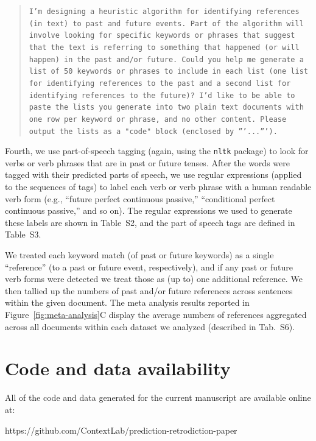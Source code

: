 \documentclass[10pt]{article}
\newcommand{\regExpTable}{S2}
\newcommand{\posTags}{S3}
\newcommand{\metaAnalysisDatasets}{S6}
\begin{document}
\begin{quote}
\texttt{I'm designing a heuristic algorithm for identifying references (in text) to
past and future events. Part of the algorithm will involve looking for specific
keywords or phrases that suggest that the text is referring to something that
happened (or will happen) in the past and/or future. Could you help me generate
a list of 50 keywords or phrases to include in each list (one list for
identifying references to the past and a second list for identifying references
to the future)? I'd like to be able to paste the lists you generate into two
plain text documents with one row per keyword or phrase, and no other content.
Please output the lists as a "code" block (enclosed by '''...''').}
\end{quote}
Fourth, we use part-of-speech tagging (again, using the \texttt{nltk} package) to look for
verbs or verb phrases that are in past or future tenses.  After the words were
tagged with their predicted parts of speech, we use regular expressions
(applied to the sequences of tags) to label each verb or verb phrase with a
human readable verb form (e.g., ``future perfect continuous passive,''
``conditional perfect continuous passive,'' and so on).  The regular expressions
we used to generate these labels are shown in Table~\regExpTable, and the part of
speech tags are defined in Table~\posTags.

We treated each keyword match (of past or future keywords) as a single
``reference'' (to a past or future event, respectively), and if any past or
future verb forms were detected we treat those as (up to) one additional
reference. We then tallied up the numbers of past and/or future references
across sentences within the given document. The meta analysis results reported
in Figure~\ref{fig:meta-analysis}C display the average numbers of references
aggregated across all documents within each dataset we analyzed (described in
Tab.~\metaAnalysisDatasets).






\section*{Code and data availability}

All of the code and data generated for the current manuscript are available
online at:

https://github.com/ContextLab/prediction-retrodiction-paper

% 

\end{document}
